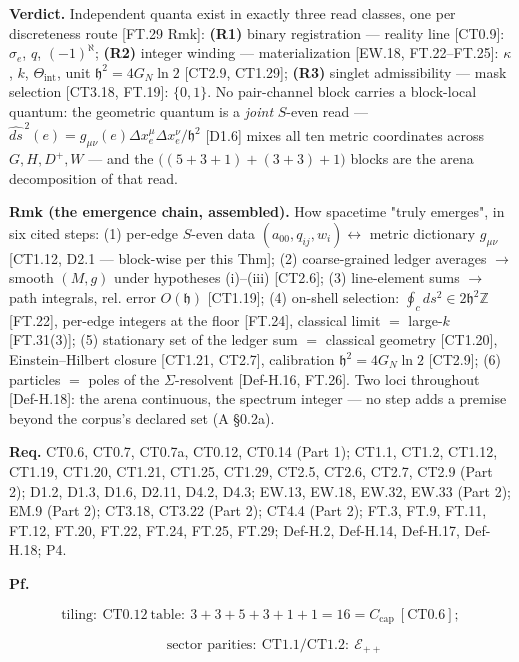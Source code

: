 \begin{theorem}
\textbf{Verdict.} Independent quanta exist in exactly three read classes, one per discreteness route [FT.29 Rmk]: \textbf{(R1)} binary registration — reality line [CT0.9]: $\sigma_e$, $q$, $(-1)^{\aleph}$; \textbf{(R2)} integer winding — materialization [EW.18, FT.22–FT.25]: $\kappa$, $k$, $\Theta_{\mathrm{int}}$, unit $\mathfrak h^2=4G_N\ln2$ [CT2.9, CT1.29]; \textbf{(R3)} singlet admissibility — mask selection [CT3.18, FT.19]: $\{0,1\}$. No pair-channel block carries a block-local quantum: the geometric quantum is a \textit{joint} $S$-even read — $\widehat{ds}^{\,2}(e)=g_{\mu\nu}(e)\Delta x^\mu_e\Delta x^\nu_e/\mathfrak h^2$ [D1.6] mixes all ten metric coordinates across $G,H,D^+,W$ — and the $\bigl((5{+}3{+}1)+(3{+}3)+1\bigr)$ blocks are the arena decomposition of that read.

\textbf{Rmk (the emergence chain, assembled).} How spacetime "truly emerges", in six cited steps: (1) per-edge $S$-even data $(a_{00},q_{ij},w_i)\leftrightarrow$ metric dictionary $g_{\mu\nu}$ [CT1.12, D2.1 — block-wise per this Thm]; (2) coarse-grained ledger averages $\to$ smooth $(M,g)$ under hypotheses (i)–(iii) [CT2.6]; (3) line-element sums $\to$ path integrals, rel. error $O(\mathfrak h)$ [CT1.19]; (4) on-shell selection: $\oint_c ds^2\in2\mathfrak h^2\mathbb Z$ [FT.22], per-edge integers at the floor [FT.24], classical limit $=$ large-$k$ [FT.31(3)]; (5) stationary set of the ledger sum $=$ classical geometry [CT1.20], Einstein–Hilbert closure [CT1.21, CT2.7], calibration $\mathfrak h^2=4G_N\ln2$ [CT2.9]; (6) particles $=$ poles of the $\Sigma$-resolvent [Def-H.16, FT.26]. Two loci throughout [Def-H.18]: the arena continuous, the spectrum integer — no step adds a premise beyond the corpus's declared set (A §0.2a).

\textbf{Req.} CT0.6, CT0.7, CT0.7a, CT0.12, CT0.14 (Part 1); CT1.1, CT1.2, CT1.12, CT1.19, CT1.20, CT1.21, CT1.25, CT1.29, CT2.5, CT2.6, CT2.7, CT2.9 (Part 2); D1.2, D1.3, D1.6, D2.11, D4.2, D4.3; EW.13, EW.18, EW.32, EW.33 (Part 2); EM.9 (Part 2); CT3.18, CT3.22 (Part 2); CT4.4 (Part 2); FT.3, FT.9, FT.11, FT.12, FT.20, FT.22, FT.24, FT.25, FT.29; Def-H.2, Def-H.14, Def-H.17, Def-H.18; P4.

\textbf{Pf.}

\[
\text{tiling}:\ \mathrm{CT0.12}\ \text{table}:\ 3{+}3{+}5{+}3{+}1{+}1=16=C_{\mathrm{cap}}\ [\mathrm{CT0.6}];
\]

\[
\qquad \text{sector parities}:\ \mathrm{CT1.1}/\mathrm{CT1.2}:\ \mathcal E_{++}
\]


\end{theorem}
